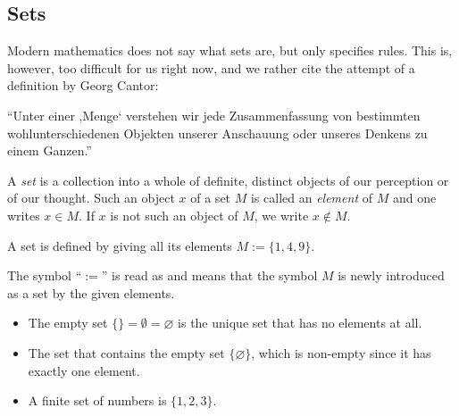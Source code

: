 

\subsection*{Sets}
%
Modern mathematics does not say what sets are, but only specifies rules. This is, however, too difficult for us right now, 
and we rather cite the attempt of a definition by Georg Cantor:

\begin{Boxx}{}
``Unter einer ‚Menge‘ verstehen wir jede Zusammenfassung von bestimmten wohlunterschiedenen Objekten unserer Anschauung oder unseres Denkens zu einem Ganzen.''
\end{Boxx}

\begin{Definition}
A \emph{set} is a collection into a whole of definite, distinct objects of our perception or of our thought.
Such an object $x$ of a set $M$ is called an \textit{element} of $M$ 
and one writes $x\in M$. If $x$ is not such an object of $M$, we write $x\not\in M$.
\end{Definition}

A set is defined by giving all its elements $M:=\{1,4,9\}$.

\begin{Boxx}{}
The symbol ``$:=$'' is read as  and
means that the symbol $M$ is newly introduced as a set by the given elements.
\end{Boxx}
%

\begin{example}
\begin{itemize}
 \item The empty set $\{\} = \emptyset = \varnothing$
 is the unique set that has no elements at all.
 \item The set that contains the empty set $\{ \varnothing \}$, which is non-empty
 since it has exactly one element.
 \item A finite set of numbers is $\{ 1,2,3\}$.
\end{itemize}
\end{example}

